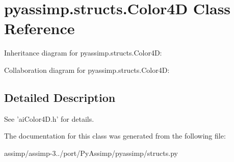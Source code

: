 \hypertarget{classpyassimp_1_1structs_1_1_color4_d}{\section{pyassimp.\+structs.\+Color4\+D Class Reference}
\label{classpyassimp_1_1structs_1_1_color4_d}
}


Inheritance diagram for pyassimp.\+structs.\+Color4\+D\+:


Collaboration diagram for pyassimp.\+structs.\+Color4\+D\+:


\subsection{Detailed Description}
\begin{DoxyVerb}See 'aiColor4D.h' for details.
\end{DoxyVerb}
 

The documentation for this class was generated from the following file\+:\begin{DoxyCompactItemize}
\item 
assimp/assimp-\/3../port/\+Py\+Assimp/pyassimp/structs.\+py\end{DoxyCompactItemize}
